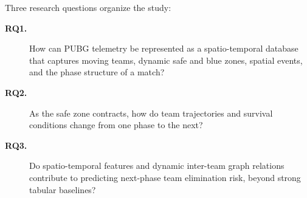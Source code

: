 Three research questions organize the study:
\begin{description}
  \item[\textbf{RQ1.}] How can PUBG telemetry be represented as a spatio-temporal database that captures moving teams, dynamic safe and blue zones, spatial events, and the phase structure of a match?
  \item[\textbf{RQ2.}] As the safe zone contracts, how do team trajectories and survival conditions change from one phase to the next?
  \item[\textbf{RQ3.}] Do spatio-temporal features and dynamic inter-team graph relations contribute to predicting next-phase team elimination risk, beyond strong tabular baselines?
\end{description}
